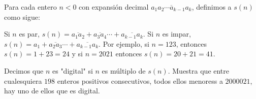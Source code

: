 Para cada entero $n\lt 0$ con expansión decimal $\overline{a_1a_2\cdots a_{k-1}a_k}$, definimos a $s(n)$ como sigue: 

Si $n$ es par, $s(n)=\overline{a_1a_2}+\overline{a_3a_4}\cdots+\overline{a_{k-1}a_k}$.
Si $n$ es impar, $s(n)=a_1+\overline{a_2a_3}\cdots+\overline{a_{k-1}a_k}$.
Por ejemplo, si $n=123$, entonces $s(n)=1+23=24$ y si $n=2021$ entonces $s(n)=20+21=41$.

Decimos que $n$ es "digital" si $n$ es múltiplo de $s(n)$. Muestra que entre cualesquiera $198$ enteros positivos consecutivos, todos ellos menoress a $2000021$, hay uno de ellos que es digital.